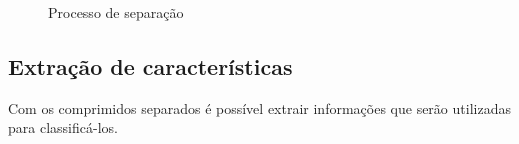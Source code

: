 \begin{figure}[H]
        
        \caption{Processo de separação}
        \label{fig:proCond}
\end{figure}

\subsection{Extração de características}

Com os comprimidos separados é possível extrair informações que serão utilizadas para classificá-los.

